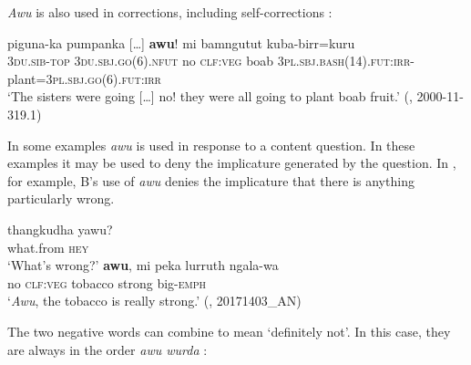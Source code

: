 \documentclass[output=paper,colorlinks,citecolor=brown]{langscibook}
\begin{document}
\textit{Awu} is also used in corrections, including self-corrections :

\ea\label{ex:mur:92} 
    \gll piguna-ka pumpanka […] \textbf{awu}! mi bamngutut kuba-birr=kuru\\
         \textsc{3du.sib-top} \textsc{3du.sbj.go(6).nfut} {} no \textsc{clf:veg} boab \textsc{3pl.sbj.bash(14).fut:irr-}plant\textsc{=3pl.sbj.go(6).fut:irr}\\
    \glt ‘The sisters were going […] no! they were all going to plant boab fruit.’ (\citealt{MansfieldEtAl2019}, 2000-11-319.1)
\z 

In some examples \textit{awu} is used in response to a content question. In these examples it may be used to deny the implicature generated by the question. In , for example, B’s use of \textit{awu} denies the implicature that there is anything particularly wrong. 

\ea\label{ex:mur:93}
    \begin{xlist}
    \label{ex:mur:93A}
        \gll  thangkudha yawu?\\ 
              what.from \textsc{hey}\\ 
        \glt ‘What’s wrong?’
    \label{ex:mur:93B}
        \gll  \textbf{awu}, mi peka lurruth ngala-wa\\ 
               no \textsc{clf:veg} tobacco strong big-\textsc{emph}\\
        \glt ‘\textit{Awu}, the tobacco is really strong.’ (\citealt{MansfieldEtAl2019}, 20171403\_AN)
    \end{xlist}
\z 

The two negative words can combine to mean ‘definitely not’. In this case, they are always in the order \textit{awu wurda} : 

    
\end{document}
